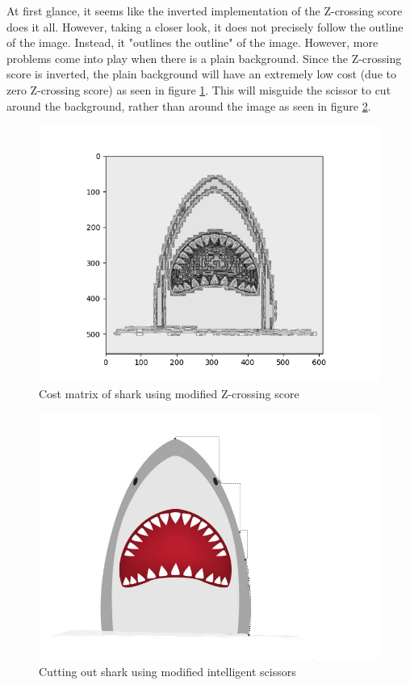 \documentclass[11pt]{article}
\begin{document}
At first glance, it seems like the inverted implementation of the Z-crossing score does it all. However, taking a closer look, it does not precisely follow the outline of the image. Instead, it "outlines the outline" of the image. However, more problems come into play when there is a plain background. Since the Z-crossing score is inverted, the plain background will have an extremely low cost (due to zero Z-crossing score) as seen in figure \ref{fig:shark_cost_mod}. This will misguide the scissor to cut around the background, rather than around the image as seen in figure \ref{fig:shark_cut_mod}.

\begin{figure}[H]
	\centering
	\includegraphics[scale = 0.5]{Cost_Shark_Modified.png}
	\caption{\label{fig:shark_cost_mod}Cost matrix of shark using modified Z-crossing score}
\end{figure}

\begin{figure}[H]
	\centering
	\includegraphics[scale = 0.5]{shark_modified_cut.png}
	\caption{\label{fig:shark_cut_mod} Cutting out shark using modified intelligent scissors}
\end{figure}
\end{document}
